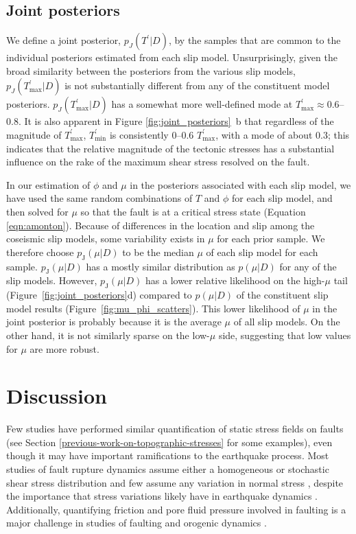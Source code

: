 \documentclass[draft,jgrga]{AGUTeX}
\begin{document}
\begin{article}
\subsection{Joint posteriors}\label{joint-posteriors}

We define a joint posterior, $p_{J}(T^\prime | D)$, by the samples that 
are common to the individual posteriors estimated from each slip model.
Unsurprisingly, given the broad similarity between the posteriors from
the various slip models, $p_{J}(T^\prime_{\mathrm{max}} | D)$ is not
substantially different from any of the constituent model posteriors.
$p_{J}(T^\prime_{\mathrm{max}} | D)$ has a somewhat more well-defined
mode at $T^\prime_{\mathrm{max}} \approx$0.6--0.8. It is also apparent in
Figure \ref{fig:joint_posteriors}~b that regardless of the magnitude of
$T^\prime_{\mathrm{max}}$, $T^\prime_{\mathrm{min}}$ is
consistently 0--0.6 $T^\prime_{\mathrm{max}}$, with a mode
of about 0.3; this indicates that the relative magnitude of the
tectonic stresses has a substantial influence on the rake of the maximum
shear stress resolved on the fault.

In our estimation of $\phi$ and $\mu$ in the posteriors associated with
each slip model, we have used the same random combinations of $T$ and
$\phi$ for each slip model, and then solved for $\mu$ so that the fault
is at a critical stress state (Equation \ref{eqn:amonton}). Because of
differences in the location and slip among the coseismic slip models,
some variability exists in $\mu$ for each prior sample. We therefore
choose $p_{\mathrm{J}}(\mu | D)$ to be the median $\mu$ of each slip
model for each sample. $p_{\mathrm{J}}(\mu | D)$ has a mostly similar
distribution as $p(\mu | D)$ for any of the slip models. However,
$p_{\mathrm{J}}(\mu | D)$ has a lower relative likelihood on the
high-$\mu$ tail (Figure~\ref{fig:joint_posteriors}d) compared to
$p(\mu | D)$ of the constituent slip model results (Figure~\ref{fig:mu_phi_scatters}). This lower
likelihood of $\mu$ in the joint posterior is probably because it is the
average $\mu$ of all slip models. On the other hand, it is not similarly
sparse on the low-$\mu$ side, suggesting that low values for $\mu$ are
more robust.

\section{Discussion}\label{discussion}

Few studies have performed similar quantification of static stress
fields on faults (see Section
\ref{previous-work-on-topographic-stresses} for some examples), even
though it may have important ramifications to the earthquake process.
Most studies of fault rupture dynamics
assume either a homogeneous or stochastic shear stress distribution
\citep[e.g.,][]{oglesbyday2002} and few assume any variation in normal
stress \citep[e.g.,][]{aagaard2001}, despite the importance that stress
variations likely have in earthquake dynamics \citep[e.g.,][]{day1982,
olsen1997}. Additionally, quantifying friction and pore fluid
pressure involved in faulting is a major challenge in studies of
faulting and orogenic dynamics \citep[e.g.,][]{meissner1982,
oglesbyday2002}.


\end{article}
\end{document}
